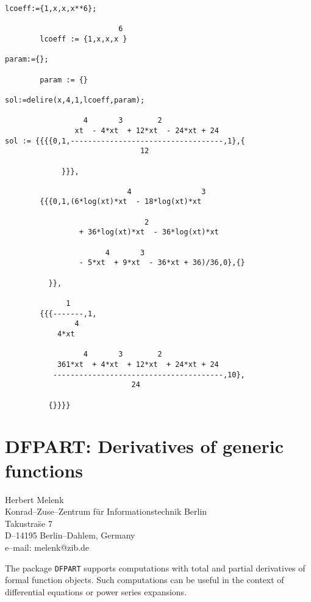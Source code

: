 \documentclass[11pt,letterpaper]{book}
\makeatletter
\newcommand{\underscore}{\_}
\newcommand{\ttindex}[1]{{\renewcommand{\_}{\protect\underscore}%
                          \index{#1@{\tt #1}}}}
\makeatother
\begin{document}
{\small\begin{verbatim}
lcoeff:={1,x,x,x**6};

                          6
        lcoeff := {1,x,x,x }

param:={};

        param := {}

sol:=delire(x,4,1,lcoeff,param);

                  4       3        2
                xt  - 4*xt  + 12*xt  - 24*xt + 24
sol := {{{{0,1,-----------------------------------,1},{
                               12

             }}},

                            4                3
        {{{0,1,(6*log(xt)*xt  - 18*log(xt)*xt

                                2
                 + 36*log(xt)*xt  - 36*log(xt)*xt

                       4       3
                 - 5*xt  + 9*xt  - 36*xt + 36)/36,0},{}

          }},

              1
        {{{-------,1,
                4
            4*xt

                  4       3        2
            361*xt  + 4*xt  + 12*xt  + 24*xt + 24
           ---------------------------------------,10},
                             24

          {}}}}
\end{verbatim}}

\chapter{DFPART: Derivatives of generic functions}
\label{DFPART}

{\footnotesize
\begin{center}
Herbert Melenk \\
Konrad--Zuse--Zentrum f\"ur Informationstechnik Berlin \\
Takustra\"se 7 \\
D--14195 Berlin--Dahlem, Germany \\[0.05in]
e--mail: melenk@zib.de
\end{center}
}

\ttindex{DFPART}

The package {\tt DFPART} supports computations with total and partial
derivatives of formal function objects. Such computations can be
useful in the context of differential equations or power series
expansions.
\end{document}
